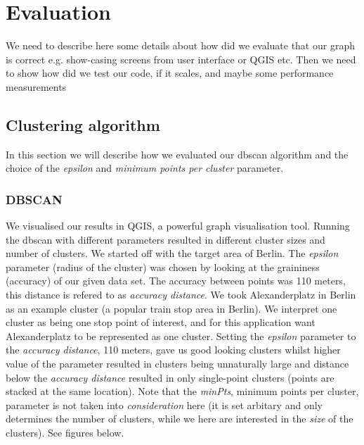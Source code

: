 \chapter{Evaluation}
\label{cha:evaluation}

We need to describe here some details about how did we evaluate that our graph is correct e.g. show-casing screens from user interface or QGIS etc. Then we need to show how did we test our code, if it scales, and maybe some performance measurements

\section{Clustering algorithm}

In this section we will describe how we evaluated our dbscan algorithm and the choice of the \textit{epsilon} and \textit{minimum points per cluster} parameter.

\subsection{DBSCAN}

We visualised our results in QGIS, a powerful graph visualisation tool. Running the dbscan with different parameters resulted in different cluster sizes and number of clusters. We started off with the target area of Berlin. The \textit{epsilon} parameter (radius of the cluster) was chosen by looking at the graininess (accuracy) of our given data set. The accuracy between points was 110 meters, this distance is refered to as \textit{accuracy distance}.
We took Alexanderplatz in Berlin as an example cluster (a popular train stop area in Berlin). We interpret one cluster as being one stop point of interest, and for this application want Alexanderplatz to be represented as one cluster. Setting the \textit{epsilon} parameter to the \textit{accuracy distance},  110 meters, gave us good looking clusters whilst higher value of the parameter resulted in clusters being unnaturally large and distance below the \textit{accuracy distance} resulted in only single-point clusters (points are stacked at the same location). Note that the \textit{minPts}, minimum points per cluster, parameter is not taken into \textit{consideration} here (it is set arbitary and only determines the number of clusters, while we here are interested in the \textit{size} of the clusters). See figures below.

